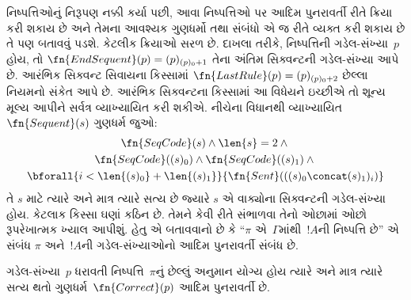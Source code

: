 \begin{explain}
નિષ્પત્તિઓનું નિરૂપણ નક્કી કર્યા પછી,
આવા નિષ્પત્તિઓ પર આદિમ પુનરાવર્તી રીતે ક્રિયા
કરી શકાય છે અને તેમના આવશ્યક ગુણધર્મો
તથા સંબંધો એ જ રીતે વ્યક્ત કરી શકાય છે
તે પણ બતાવવું પડશે. કેટલીક ક્રિયાઓ
સરળ છે. દાખલા તરીકે, નિષ્પત્તિની
ગડેલ-સંખ્યા~$p$ હોય, તો
$\fn{EndSequent}(p) = (p)_{(p)_0+1}$
તેના અંતિમ સિક્વન્ટની ગડેલ-સંખ્યા આપે છે.
આરંભિક સિક્વન્ટ સિવાયના કિસ્સામાં
$\fn{LastRule}(p) = (p)_{(p)_0+2}$
છેલ્લા નિયમનો સંકેત આપે છે.
આરંભિક સિક્વન્ટના કિસ્સામાં આ વિધેયને
ઇચ્છીએ તો શૂન્ય મૂલ્ય આપીને સર્વત્ર
વ્યાખ્યાયિત કરી શકીએ.
નીચેના વિધાનથી વ્યાખ્યાયિત
$\fn{Sequent}(s)$ ગુણધર્મ જુઓ:
\begin{multline*}
  \fn{SeqCode}(s) \land \len{s} = 2 \land {}\\
  \fn{SeqCode}((s)_0) \land \fn{SeqCode}((s)_1) \land {}\\
  \bforall{i<\len{(s)_0} + \len{(s)_1}}{\fn{Sent}(((s)_0 \concat (s)_1)_i)}
\end{multline*}
તે $s$ માટે ત્યારે અને માત્ર ત્યારે
સત્ય છે જ્યારે $s$ એ વાક્યોના
સિક્વન્ટની ગડેલ-સંખ્યા હોય. કેટલાક
કિસ્સા ઘણાં કઠિન છે. તેમને કેવી રીતે
સંભાળવા તેનો ઓછામાં ઓછો રૂપરેખાત્મક
ખ્યાલ આપીશું. હેતુ એ બતાવવાનો છે કે
``$\pi$ એ~$\Gamma$માંથી~$!A$ની
નિષ્પત્તિ છે'' એ સંબંધ
$\pi$ અને~$!A$ની ગડેલ-સંખ્યાઓનો
આદિમ પુનરાવર્તી સંબંધ છે.
\end{explain}

\begin{prop}
  ગડેલ-સંખ્યા~$p$ ધરાવતી
  નિષ્પત્તિ~$\pi$નું છેલ્લું અનુમાન
  યોગ્ય હોય ત્યારે અને માત્ર ત્યારે સત્ય
  થતો ગુણધર્મ~$\fn{Correct}(p)$ આદિમ
  પુનરાવર્તી છે.
\end{prop}

